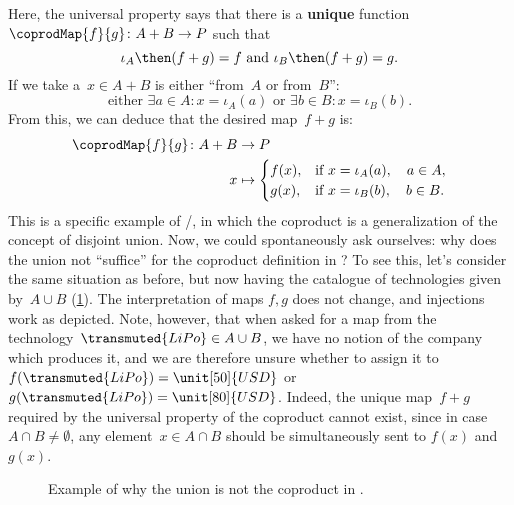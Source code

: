 \begin{example}
Here, the universal property says that there is a \textbf{unique} function~$\coprodMap{f}{g}\colon A+B\to P$ such that
\begin{equation*}
    \iota_A\then (f+ g)=f \text{ and }\iota_B\then (f+ g)=g.
\end{equation*}
If we take a~$x\in A+B$ is either ``from~$A$ or from~$B$'':
\begin{equation*}
    \text{either } \exists a\in A:x=\iota_A(a) \text{ or }\exists b\in B:x=\iota_B(b).
\end{equation*}
From this, we can deduce that the desired map~$f+g$ is:
\begin{equation*}
\begin{aligned}
    \coprodMap{f}{g} \colon  A + B &\to P \\
    x &   \mapsto
    \begin{cases}
        f(x),& \text{if } x=\iota_A(a),\quad a \in A, \\
        g(x),& \text{if } x=\iota_B(b),\quad b \in B.
    \end{cases}
\end{aligned}
\end{equation*}
This is a specific example of \Set/\FinSet, in which the coproduct is a generalization of the concept of disjoint union. Now, we could spontaneously ask ourselves: why does the union not ``suffice'' for the coproduct definition in \Set? To see this, let's consider the same situation as before, but now having the catalogue of technologies given by~$A\cup B$ (\cref{fig:coprod_batteries_2}). The interpretation of maps $f,g$ does not change, and injections work as depicted. Note, however, that when asked for a map from the technology~$\transmuted{LiPo}\in A\cup B$, we have no notion of the company which produces it, and we are therefore unsure whether to assign it to~$f(\transmuted{LiPo})=\unit[50]{USD}$ or~$g(\transmuted{LiPo})=\unit[80]{USD}$. Indeed, the unique map~$f+g$ required by the universal property of the coproduct cannot exist, since in case $A\cap B\neq \emptyset$, any element~$x\in A\cap B$ should be simultaneously sent to $f(x)$ and $g(x)$.

\begin{figure}[h!]
    \centering
    \caption{Example of why the union is not the coproduct in \Set.}
    \label{fig:coprod_batteries_2}
\end{figure}
\end{example}


